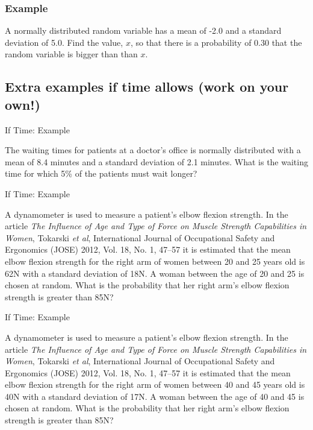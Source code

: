 \begin{frame}
  \frametitle{Example}

  A normally distributed random variable has a mean of -2.0 and a
  standard deviation of 5.0. Find the value, $x$, so that there is a
  probability of 0.30 that the random variable is bigger than than
  $x$.

  \vfill

\end{frame}

\subsection{Extra examples if time allows (work on your own!)}

\begin{frame}{If Time: Example}

  The waiting times for patients at a doctor's office is normally
  distributed with a mean of 8.4 minutes and a standard deviation of
  2.1 minutes. What is the waiting time for which 5\% of the patients
  must wait longer?
  
  \vfill

\end{frame}


\begin{frame}{If Time: Example}

  A dynamometer is used to measure a patient's elbow flexion
  strength. In the article \textit{The Influence of Age and Type of
    Force on Muscle Strength Capabilities in Women}, Tokarski
  \textit{et al}, International Journal of Occupational Safety and
  Ergonomics (JOSE) 2012, Vol. 18, No. 1, 47–57 it is estimated that
  the mean elbow flexion strength for the right arm of women between
  20 and 25 years old is 62N with a standard deviation of 18N. A
  woman between the age of 20 and 25 is chosen at random. What is the
  probability that her right arm's elbow flexion strength is greater
  than 85N?

  
  \vfill

\end{frame}


\begin{frame}{If Time: Example}

  A dynamometer is used to measure a patient's elbow flexion
  strength. In the article \textit{The Influence of Age and Type of
    Force on Muscle Strength Capabilities in Women}, Tokarski
  \textit{et al}, International Journal of Occupational Safety and
  Ergonomics (JOSE) 2012, Vol. 18, No. 1, 47–57 it is estimated that
  the mean elbow flexion strength for the right arm of women between
  40 and 45 years old is 40N with a standard deviation of 17N. A
  woman between the age of 40 and 45 is chosen at random. What is the
  probability that her right arm's elbow flexion strength is greater
  than 85N?

  
  \vfill

\end{frame}



